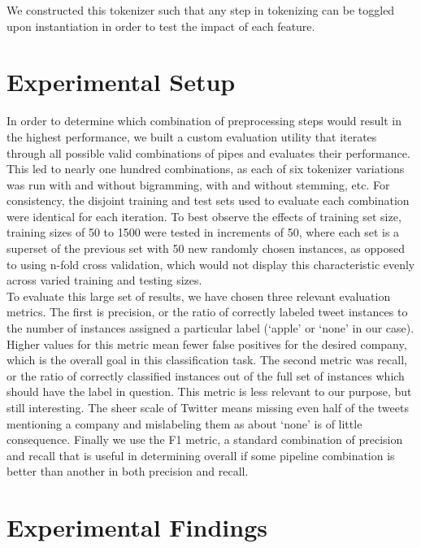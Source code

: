 \documentclass[letterpaper]{article}
\begin{document}
We constructed this tokenizer such that any step in tokenizing can be toggled upon instantiation in order to test the impact of each feature.\\

\section{Experimental Setup}
In order to determine which combination of preprocessing steps would result in the highest performance, we built a custom evaluation utility that iterates through all possible valid combinations of pipes and evaluates their performance. This led to nearly one hundred combinations, as each of six tokenizer variations was run with and without bigramming, with and without stemming, etc. For consistency, the disjoint training and test sets used to evaluate each combination were identical for each iteration. To best observe the effects of training set size, training sizes of 50 to 1500 were tested in increments of 50, where each set is a superset of the previous set with 50 new randomly chosen instances, as opposed to using n-fold cross validation, which would not display this characteristic evenly across varied training and testing sizes. \\

To evaluate this large set of results, we have chosen three relevant evaluation metrics. The first is precision, or the ratio of correctly labeled tweet instances to the number of instances assigned a particular label (`apple' or `none' in our case). Higher values for this metric mean fewer false positives for the desired company, which is the overall goal in this classification task. The second metric was recall, or the ratio of correctly classified instances out of the full set of instances which should have the label in question. This metric is less relevant to our purpose, but still interesting. The sheer scale of Twitter means missing even half of the tweets mentioning a company and mislabeling them as about `none' is of little consequence. Finally we use the F1 metric, a standard combination of precision and recall that is useful in determining overall if some pipeline combination is better than another in both precision and recall.



\section{Experimental Findings}
\end{document}
